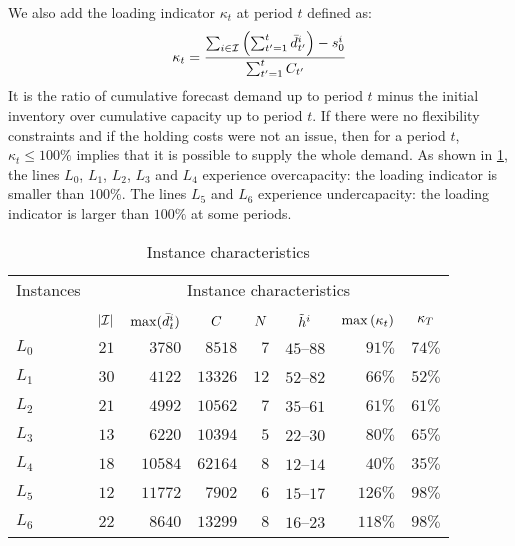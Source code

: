 We also add the loading indicator $\kappa_t$ at period $t$ defined as:
\begin{equation}
  \kappa_t = \frac{\sum_{i\in\REF} \bracket{\sum_{t'=1}^{t} \bar{\demand}_{t'}^i}-\inventory_0^i}{ \sum_{t'=1}^{t} \capacity_{t'}}
\end{equation}
It is the ratio of cumulative forecast demand up to period $t$ minus the initial inventory over cumulative capacity up to period $t$.
If there were no flexibility constraints and if the holding costs were not an issue, then for a period $t$, $\kappa_t \le 100\%$ implies that it is possible to supply the whole demand.
As shown in \cref{tab:pdp:instances-characterisitcs}, the lines $L_0$, $L_1$, $L_2$, $L_3$ and $L_4$ experience overcapacity: the loading indicator is smaller than $100\%$.
The lines $L_5$ and $L_6$ experience undercapacity: the loading indicator is larger than $100\%$ at some periods.

\begin{table}[ht]
\begin{center}
\begin{tabular*}{\linewidth}{@{\extracolsep{\fill}}lrrrrrrr@{\extracolsep{\fill}}}
\hline
Instances &
\multicolumn{7}{c}{Instance characteristics}
\\\cline{2-8}
\\
& $\card{\REF}$
& $\max(\bar{d}_t^i)$
& \multicolumn{1}{c}{$C$}
& \multicolumn{1}{c}{$N$}
& \multicolumn{1}{c}{$\tilde{h}^i$}
& \multicolumn{1}{c}{$\max\bracket{\kappa_t}$}
& \multicolumn{1}{c}{$\kappa_{T}$}
\\\hline
$L_0$ & $21$ & $3780$ & $8518$ & $7$ & $45$--$88$ & $91\%$ & $74\%$
\\
$L_1$ & $30$ & $4122$ & $13326$ & $12$ & $52$--$82$ & $66\%$ & $52\%$
\\
$L_2$ & $21$ & $4992$ & $10562$ & $7$ & $35$--$61$ & $61\%$ & $61\%$
\\
$L_3$ & $13$ & $6220$ & $10394$ & $5$ & $22$--$30$ & $80\%$ & $65\%$
\\
$L_4$ & $18$ & $10584$ & $62164$ & $8$ & $12$--$14$ & $40\%$ & $35\%$
\\
$L_5$ & $12$ & $11772$ & $7902$ & $6$ & $15$--$17$ & $126\%$ & $98\%$
\\
$L_6$ & $22$ & $8640$ & $13299$ & $8$ & $16$--$23$ & $118\%$ & $98\%$
\\\hline
\end{tabular*}
\caption{Instance characteristics}
\label{tab:pdp:instances-characterisitcs}
\end{center}
\end{table}


